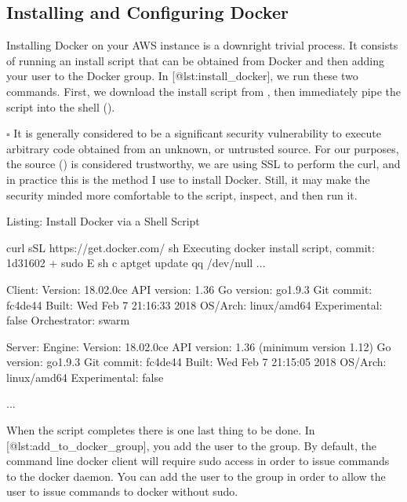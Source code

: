 \documentclass[letterpaper,10pt,english]{sphinxmanual}
\begin{document}
\subsection{Installing and Configuring Docker}
\label{\detokenize{02-elastic-compute-cloud:Installing-and-Configuring-Docker}}
Installing Docker on your AWS instance is a downright trivial process.
It consists of running an install script that can be obtained from
Docker and then adding your user to the Docker group. In
{[}@lst:install\_docker{]}, we run these two commands. First, we download
the install script from , then immediately pipe
the script into the shell ().

\(\square\)  It is generally considered to be a significant
security vulnerability to execute arbitrary code obtained from an
unknown, or untrusted source. For our purposes, the source
() is considered trustworthy, we are using SSL to
perform the curl, and in practice this is the method I use to install
Docker. Still, it may make the security minded more comfortable to
 the script, inspect, and then run it.

Listing: Install Docker via a Shell Script

%
\begin{sphinxVerbatim}[commandchars=\\\{\}]
\PYGZdl{} curl \PYGZhy{}sSL https://get.docker.com/ \textbar{} sh
\PYGZsh{} Executing docker install script, commit: 1d31602
+ sudo \PYGZhy{}E sh \PYGZhy{}c apt\PYGZhy{}get update \PYGZhy{}qq \PYGZgt{}/dev/null
...

Client:
 Version:   18.02.0\PYGZhy{}ce
 API version:   1.36
 Go version:    go1.9.3
 Git commit:    fc4de44
 Built: Wed Feb  7 21:16:33 2018
 OS/Arch:   linux/amd64
 Experimental:  false
 Orchestrator:  swarm

Server:
 Engine:
  Version:  18.02.0\PYGZhy{}ce
  API version:  1.36 (minimum version 1.12)
  Go version:   go1.9.3
  Git commit:   fc4de44
  Built:    Wed Feb  7 21:15:05 2018
  OS/Arch:  linux/amd64
  Experimental: false

...
\end{sphinxVerbatim}

When the script completes there is one last thing to be done. In
{[}@lst:add\_to\_docker\_group{]}, you add the  user to the
 group. By default, the command line docker client will
require sudo access in order to issue commands to the docker daemon. You
can add the  user to the  group in order to allow
the  user to issue commands to docker without sudo.
\end{document}
